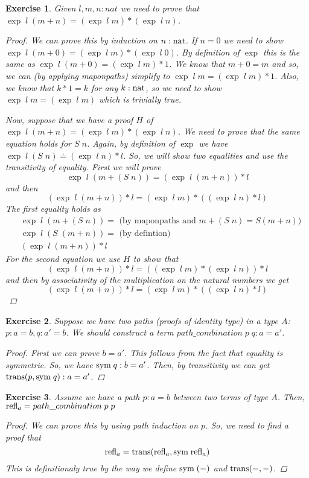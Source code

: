 \documentclass[10pt]{article}
\newtheorem{exercise}{Exercise}
\begin{document}
\begin{exercise}
Given $l, m, n : nat$ we need to prove that
$\exp \; l \; (m + n) = (\exp \; l \; m) * (\exp \; l \; n)$.
\begin{proof}
We can prove this by induction on $n : \text{nat}$.
If $n = 0$ we need to show
$\exp \; l \; (m + 0) = (\exp \; l \; m) * (\exp \; l \; 0)$.
By definition of $\exp$ this is the same as
$\exp \; l \; (m + 0) = (\exp \; l \; m) * 1$. We know that
$m + 0 = m$ and so, we can (by applying maponpaths)
simplify to $\exp \; l \; m = (\exp \; l \; m) * 1$.
Also, we know that $k * 1 = k$ for any $k : \text{nat}$, so
we need to show $\exp \; l \; m = (\exp \; l \; m)$
which is trivially true.

Now, suppose that we have a proof $H$ of
$\exp \; l \; (m + n) = (\exp \; l \; m) * (\exp \; l \; n)$.
We need to prove that the same equation holds for
$S \; n$. Again, by definition of $\exp$ we have
$\exp \; l \; (S \; n) \doteq (\exp \; l \; n) * l$.
So, we will show two equalities and use the transitivity
of equality. First we will prove
\[
 \exp \; l \; (m + (S \; n)) = (\exp \; l \; (m + n)) * l
\]
and then
\[
 (\exp \; l \; (m + n)) * l = (\exp \; l \; m) * ((\exp \; l \; n) * l)
\]
The first equality holds as
\begin{align*}
 &\exp \; l \; (m + (S \; n)) = \text{ (by maponpaths and $m + (S \; n) = S(m + n)$)}\\
 &\exp \; l \; (S \; (m + n)) = \text{ (by defintion)} \\
 &(\exp \; l \; (m + n)) * l
\end{align*}
For the second equation we use $H$ to show that
\[
 (\exp \; l \; (m + n)) * l = ((\exp \; l \; m) * (\exp \; l \; n)) * l
\]
and then by associativity of the multiplication
on the natural numbers we get
\[
 (\exp \; l \; (m + n)) * l = (\exp \; l \; m) * ((\exp \; l \; n) * l)
\]
\end{proof}
\end{exercise}

\begin{exercise}
Suppose we have two paths (proofs of identity type)
in a type $A$: $p : a = b, q: a' = b$. We should construct
a term $path\_combination \; p \; q: a = a'$.
\begin{proof}
First we can prove $b = a'$. This follows from the
fact that equality is symmetric. So, we have
$\text{sym} \; q : b = a'$. Then, by transitivity
we can get $\text{trans}(p, \text{sym} \; q) : a = a'$.
\end{proof}
\end{exercise}

\begin{exercise}
Assume we have a path $p : a = b$ between two
terms of type $A$. Then, $\text{refl}_a = path\_combination \; p \; p$
\begin{proof}
We can prove this by using path induction on $p$.
So, we need to find a proof that
\[
 \text{refl}_a = \text{trans}(\text{refl}_a, \text{sym} \; \text{refl}_a)
\]
This is definitionaly true by the way we define
$\text{sym} \; (-)$ and $\text{trans}(-, -)$.
\end{proof}
\end{exercise}
\end{document}

